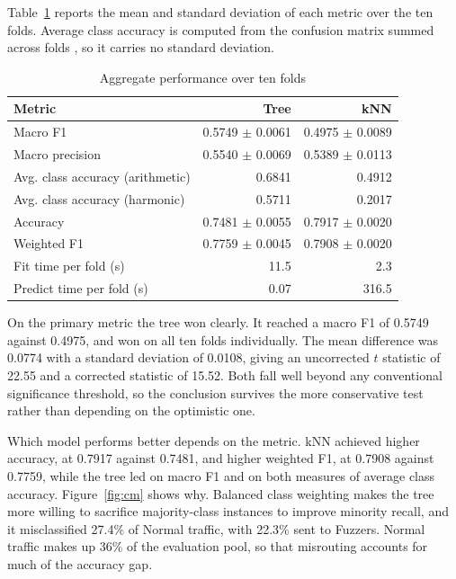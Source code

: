 \documentclass[conference]{IEEEtran}
\begin{document}
Table~\ref{tab:aggregate} reports the mean and standard deviation of each metric
over the ten folds. Average class accuracy is computed from the confusion matrix
summed across folds \cite{kelleher2015}, so it carries no standard deviation.

\begin{table}[t]
\caption{Aggregate performance over ten folds}
\label{tab:aggregate}
\centering
\small
\begin{tabular}{l r r}
\toprule
Metric & Tree & kNN \\
\midrule
Macro F1                          & 0.5749 $\pm$ 0.0061 & 0.4975 $\pm$ 0.0089 \\
Macro precision                   & 0.5540 $\pm$ 0.0069 & 0.5389 $\pm$ 0.0113 \\
Avg. class accuracy (arithmetic)  & 0.6841 & 0.4912 \\
Avg. class accuracy (harmonic)    & 0.5711 & 0.2017 \\
Accuracy                          & 0.7481 $\pm$ 0.0055 & 0.7917 $\pm$ 0.0020 \\
Weighted F1                       & 0.7759 $\pm$ 0.0045 & 0.7908 $\pm$ 0.0020 \\
Fit time per fold (s)             & 11.5 & 2.3 \\
Predict time per fold (s)         & 0.07 & 316.5 \\
\bottomrule
\end{tabular}
\end{table}

On the primary metric the tree won clearly. It reached a macro F1 of 0.5749
against 0.4975, and won on all ten folds individually. The mean difference was
0.0774 with a standard deviation of 0.0108, giving an uncorrected $t$ statistic
of 22.55 and a corrected statistic of 15.52. Both fall well beyond any
conventional significance threshold, so the conclusion survives the more
conservative test rather than depending on the optimistic one.

Which model performs better depends on the metric. kNN achieved higher
accuracy, at 0.7917 against 0.7481, and higher weighted F1, at 0.7908 against
0.7759, while the tree led on macro F1 and on both measures of average class
accuracy. Figure~\ref{fig:cm} shows why. Balanced class weighting makes the
tree more willing to sacrifice majority-class instances to improve minority
recall, and it misclassified 27.4\% of Normal traffic, with 22.3\% sent to
Fuzzers. Normal traffic makes up 36\% of the evaluation pool, so that
misrouting accounts for much of the accuracy gap.
\end{document}
